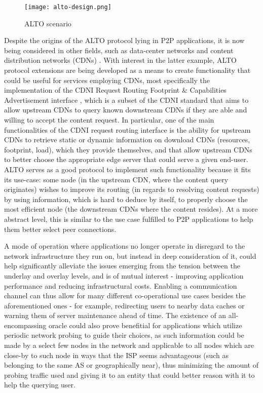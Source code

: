 \documentclass[
  oneside,
  11pt, a4paper,
  footinclude=true,
  headinclude=true,
  cleardoublepage=empty
]{scrbook}
\begin{document}
    \begin{figure}[!h]
    \centering
    \texttt{[image: alto-design.png]}
    \caption{ALTO scenario \cite{seedorf2009}}
    \label{fig:alto-design}
    \end{figure}
    
    Despite the origins of the ALTO protocol lying in P2P applications, it is now being considered in other fields, such as data-center networks and content distribution networks (CDNs) \cite{alto-about}. With interest in the latter example, ALTO protocol extensions are being developed as a means to create functionality that could be useful for services employing CDNs, most specifically the implementation of the CDNI Request Routing Footprint \& Capabilities Advertisement interface \cite{alto-cdni}, which is a subset of the CDNI standard \cite{cdni-problem-statement} that aims to allow upstream CDNs to query known downstream CDNs if they are able and willing to accept the content request. In particular, one of the main functionalities of the CDNI request routing interface is the ability for upstream CDNs to retrieve static or dynamic information on download CDNs (resources, footprint, load), which they provide themselves, and that allow upstream CDNs to better choose the appropriate edge server that could serve a given end-user. ALTO serves as a good protocol to implement such functionality because it fits its use-case: some node (in the upstream CDN, where the content query originates) wishes to improve its routing (in regards to resolving content requests) by using information, which is hard to deduce by itself, to properly choose the most efficient node (the downstream CDNs where the content resides). At a more abstract level, this is similar to the use case fulfilled to P2P applications to help them better select peer connections.
    
    A mode of operation where applications no longer operate in disregard to the network infrastructure they run on, but instead in deep consideration of it, could help significantly alleviate the issues emerging from the tension between the underlay and overlay levels, and is of mutual interest - improving application performance and reducing infrastructural costs. Enabling a communication channel can thus allow for many different co-operational use cases besides the aforementioned ones - for example, redirecting users to nearby data caches or warning them of server maintenance ahead of time. The existence of an all-encompassing oracle could also prove benefitial for applications which utilize periodic network probing to guide their choices, as such information could be made by a select few nodes in the network and applicable to all nodes which are close-by to such node in ways that the ISP seems advantageous (such as belonging to the same AS or geographically near), thus minimizing the amount of probing traffic used and giving it to an entity that could better reason with it to help the querying user. 
    
\end{document}
